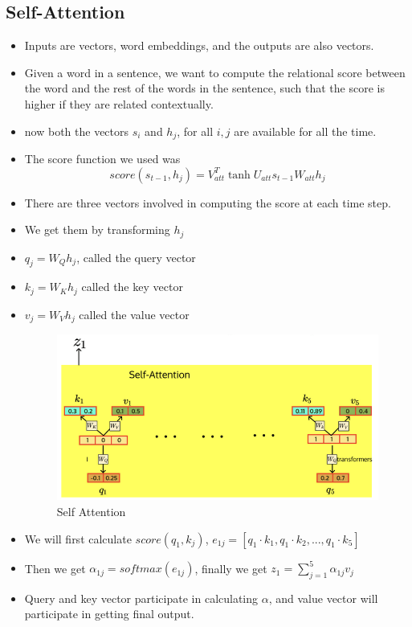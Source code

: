 \documentclass[a4paper]{article}
\begin{document}
\subsection{Self-Attention}
\begin{itemize}
    \item Inputs are vectors, word embeddings, and the outputs are also vectors.
    \item Given a word in a sentence, we want to compute the relational score between the word and the rest of the words in the sentence, such that the score is higher if they are related contextually.
    \item now both the vectors $s_i$ and $h_j$, for all $i,j$ are available for all the time.
    \item The score function we used was
    \begin{equation*}
        score(s_{t-1},h_j)=V_{att}^T\tanh{U_{att}s_{t-1}W_{att}h_j}
    \end{equation*}
    \item There are three vectors involved in computing the score at each time step.
    \item We get them by transforming $h_j$
    \item $q_j=W_Qh_j$, called the query vector
    \item $k_j=W_Kh_j$ called the key vector
    \item $v_j=W_Vh_j$ called the value vector
    \begin{figure}[H]
        \centering
        \includegraphics[width=0.8\linewidth]{Degree//static/DL_self_attention.png}
        \caption{Self Attention}
    \end{figure}
    \item We will first calculate $score(q_1,k_j)$, $e_{1j}=[q_1\cdot k_1,q_1\cdot k_2,...,q_1\cdot k_5]$
    \item Then we get $\alpha_{1j}=softmax(e_{1j})$, finally we get $z_1=\sum_{j=1}^5\alpha_{1j}v_j$
    \item Query and key vector participate in calculating $\alpha$, and value vector will participate in getting final output.

\end{itemize}
\end{document}
